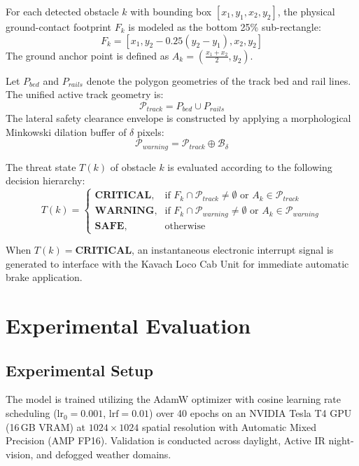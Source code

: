 \documentclass[conference]{IEEEtran}
\begin{document}
For each detected obstacle $k$ with bounding box $[x_1, y_1, x_2, y_2]$, the physical ground-contact footprint $F_k$ is modeled as the bottom 25\% sub-rectangle:
\begin{equation}
F_k = \left[ x_1, y_2 - 0.25(y_2 - y_1), x_2, y_2 \right]
\end{equation}
The ground anchor point is defined as $A_k = \left( \frac{x_1 + x_2}{2}, y_2 \right)$.

Let $P_{bed}$ and $P_{rails}$ denote the polygon geometries of the track bed and rail lines. The unified active track geometry is:
\begin{equation}
\mathcal{P}_{track} = P_{bed} \cup P_{rails}
\end{equation}
The lateral safety clearance envelope is constructed by applying a morphological Minkowski dilation buffer of $\delta$ pixels:
\begin{equation}
\mathcal{P}_{warning} = \mathcal{P}_{track} \oplus \mathcal{B}_\delta
\end{equation}

The threat state $T(k)$ of obstacle $k$ is evaluated according to the following decision hierarchy:
\begin{equation}
T(k) = \begin{cases}
\textbf{CRITICAL}, & \text{if } F_k \cap \mathcal{P}_{track} \neq \emptyset \text{ or } A_k \in \mathcal{P}_{track} \\
\textbf{WARNING},  & \text{if } F_k \cap \mathcal{P}_{warning} \neq \emptyset \text{ or } A_k \in \mathcal{P}_{warning} \\
\textbf{SAFE},     & \text{otherwise}
\end{cases}
\end{equation}

When $T(k) = \textbf{CRITICAL}$, an instantaneous electronic interrupt signal is generated to interface with the Kavach Loco Cab Unit for immediate automatic brake application.

\section{Experimental Evaluation}

\subsection{Experimental Setup}
The model is trained utilizing the AdamW optimizer with cosine learning rate scheduling ($\text{lr}_0 = 0.001$, $\text{lrf} = 0.01$) over 40 epochs on an NVIDIA Tesla T4 GPU (16\,GB VRAM) at $1024 \times 1024$ spatial resolution with Automatic Mixed Precision (AMP FP16). Validation is conducted across daylight, Active IR night-vision, and defogged weather domains.
\end{document}
